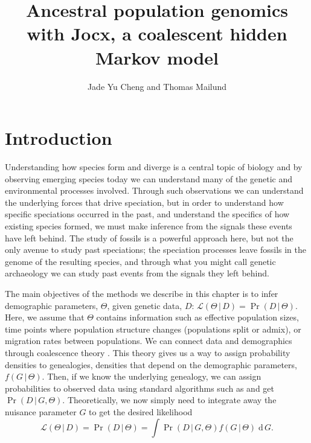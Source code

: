 \documentclass[graybox]{svmult}
\renewcommand{\lhd}{\ensuremath{\mathcal{L}}}
\newcommand{\intd}{\ensuremath{\mathrm{\;d\,}}}
\begin{document}
\title*{Ancestral population genomics with Jocx, a coalescent hidden Markov model}
\author{Jade Yu Cheng and Thomas Mailund}
\maketitle



\section{Introduction}



Understanding how species form and diverge is a central topic of biology and by observing emerging species today we can understand many of the genetic and environmental processes involved. Through such observations we can understand the underlying forces that drive speciation, but in order to understand how specific speciations occurred in the past, and understand the specifics of how existing species formed, we must make inference from the signals these events have left behind. The study of fossils is a powerful approach here, but not the only avenue to study past speciations; the speciation processes leave fossils in the genome of the resulting species, and through what you might call genetic archaeology we can study past events from the signals they left behind.


The main objectives of the methods we describe in this chapter is to infer demographic parameters, $\Theta$, given genetic data, $D$: $\lhd(\Theta\,|\,D)=\Pr(D\,|\,\Theta)$. Here, we assume that $\Theta$ contains information such as effective population sizes, time points where population structure changes (populations split or admix), or migration rates between populations. We can connect data and demographics through coalescence theory \cite{Hein:2004ta}. This theory gives us a way to assign probability densities to genealogies, densities that depend on the demographic parameters, $f(G\,|\,\Theta)$. Then, if we know the underlying genealogy, we can assign probabilities to observed data using standard algorithms such as \citet{Felsenstein_1981} and get $\Pr(D\,|\,G,\Theta)$. Theoretically, we now simply need to integrate away the nuisance parameter $G$ to get the desired likelihood
\begin{equation}
	\label{eq:likelihood}
	\lhd(\Theta\,|\,D) = \Pr(D\,|\,\Theta)
	= \int \Pr(D\,|\,G,\Theta) f(G\,|\,\Theta) \intd G .
\end{equation}
\end{document}
